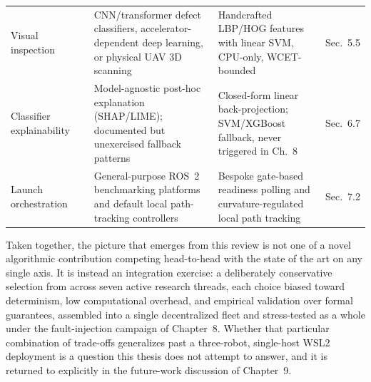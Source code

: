 \begin{table}[p]
\begin{tabularx}{\textwidth}{@{} 
  >{\raggedright\arraybackslash}p{1.4cm} 
  >{\raggedright\arraybackslash}p{1.4cm} 
  X 
  X 
  >{\raggedright\arraybackslash}p{0.8cm} @{}}
Visual inspection & \cite{hussain2023custom,sen2025feature,benmachiche2026realtime,tsiakas2024autonomous} & CNN/transformer defect classifiers, accelerator-dependent deep learning, or physical UAV 3D scanning & Handcrafted LBP/HOG features with linear SVM, CPU-only, WCET-bounded & Sec.~5.5 \\ \addlinespace
Classifier explainability & \cite{sakai2022explainable,myllyaho2022misbehaviour} & Model-agnostic post-hoc explanation (SHAP/LIME); documented but unexercised fallback patterns & Closed-form linear back-projection; SVM/XGBoost fallback, never triggered in Ch.~8 & Sec.~6.7 \\ \addlinespace
Launch orchestration & \cite{macenski2023fromdesks,shcherbyna2024arena,macenski2023regulated} & General-purpose ROS~2 benchmarking platforms and default local path-tracking controllers & Bespoke gate-based readiness polling and curvature-regulated local path tracking & Sec.~7.2 \\ \bottomrule
\end{tabularx}
\end{table}

\clearpage

Taken together, the picture that emerges from this review is not one of a novel algorithmic contribution competing head-to-head with the state of the art on any single axis. It is instead an integration exercise: a deliberately conservative selection from across seven active research threads, each choice biased toward determinism, low computational overhead, and empirical validation over formal guarantees, assembled into a single decentralized fleet and stress-tested as a whole under the fault-injection campaign of Chapter~8. Whether that particular combination of trade-offs generalizes past a three-robot, single-host WSL2 deployment is a question this thesis does not attempt to answer, and it is returned to explicitly in the future-work discussion of Chapter~9.